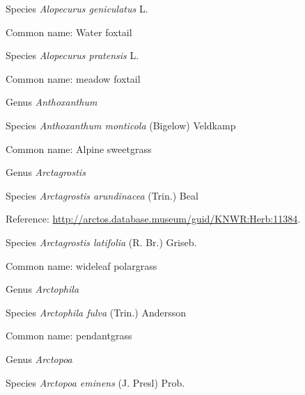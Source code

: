 \documentclass[9pt, article]{memoir}
\begin{document}
\begin{multicols}{2}
\vspace{6pt}\noindent\hspace{36pt}Species \textit{Alopecurus geniculatus} L.


Common name: Water foxtail

\vspace{6pt}\noindent\hspace{36pt}Species \textit{Alopecurus pratensis} L.


Common name: meadow foxtail

\vspace{6pt}\noindent\hspace{30pt}Genus \textit{Anthoxanthum}


\vspace{6pt}\noindent\hspace{36pt}Species \textit{Anthoxanthum monticola} (Bigelow) Veldkamp


Common name: Alpine sweetgrass

\vspace{6pt}\noindent\hspace{30pt}Genus \textit{Arctagrostis}


\vspace{6pt}\noindent\hspace{36pt}Species \textit{Arctagrostis arundinacea} (Trin.) Beal


Reference: 
\url{http://arctos.database.museum/guid/KNWR:Herb:11384}.

\vspace{6pt}\noindent\hspace{36pt}Species \textit{Arctagrostis latifolia} (R. Br.) Griseb.


Common name: wideleaf polargrass

\vspace{6pt}\noindent\hspace{30pt}Genus \textit{Arctophila}


\vspace{6pt}\noindent\hspace{36pt}Species \textit{Arctophila fulva} (Trin.) Andersson


Common name: pendantgrass

\vspace{6pt}\noindent\hspace{30pt}Genus \textit{Arctopoa}


\vspace{6pt}\noindent\hspace{36pt}Species \textit{Arctopoa eminens} (J. Presl) Prob.



\end{multicols}
\end{document}
